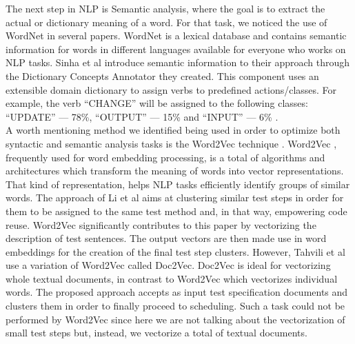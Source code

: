 The next step in NLP is Semantic analysis, where the goal is to extract the actual or dictionary meaning of a word. For that task, we noticed 
the use of WordNet in several papers\cite{soeken2012assisted, rane2017automatic, arruda2020automation}. WordNet is a lexical database and contains semantic 
information for words in different languages available for everyone who works on NLP tasks. Sinha et al \cite{sinha2009linguistic} introduce semantic 
information to their approach through the Dictionary Concepts Annotator they created. This component uses an extensible domain dictionary to assign 
verbs to predefined actions/classes. For example, the verb ``CHANGE'' will be assigned to the following classes: ``UPDATE'' --- 78\%, ``OUTPUT'' 
--- 15\% and ``INPUT'' --- 6\% \cite{sinha2009linguistic}.\\

A worth mentioning method we identified being used in order to optimize both syntactic and semantic analysis tasks is the Word2Vec technique \cite{10.1145/3368089.3417067, reqclass, chen2021test}. 
Word2Vec \cite{mikolov2013distributed}, frequently used for word embedding processing, is a total of algorithms and architectures which transform the meaning of words into vector representations. 
That kind of representation, helps NLP tasks efficiently identify groups of similar words. The approach of Li et al \cite{10.1145/3368089.3417067} aims at clustering similar test steps in order for 
them to be assigned to the same test method and, in that way, empowering code reuse. Word2Vec significantly contributes to this paper by vectorizing the description of test sentences. The output vectors 
are then made use in word embeddings for the creation of the final test step clusters. However, Tahvili et al \cite{10.1145/3195538.3195540} use a variation of Word2Vec called Doc2Vec. 
Doc2Vec \cite{mikolov2013efficient} is ideal for vectorizing whole textual documents, in contrast to Word2Vec which vectorizes individual words. The proposed approach accepts as input test specification 
documents and clusters them in order to finally proceed to scheduling. Such a task could not be performed by Word2Vec since here we are not talking about the vectorization of small test steps but, instead, 
we vectorize a total of textual documents.\\

